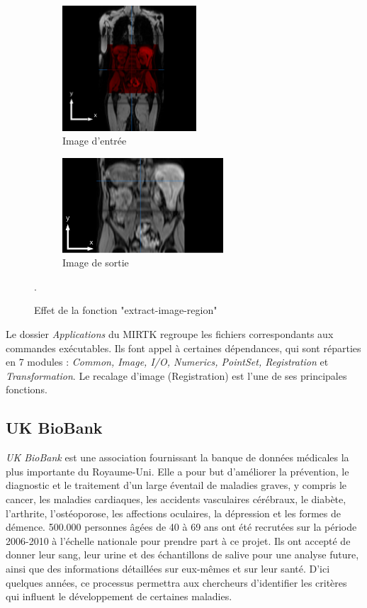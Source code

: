 \documentclass[10pt]{report}
\begin{document}
	\begin{figure}[h!]
		\centering
		\begin{subfigure}{.5\textwidth}
			\centering
			\includegraphics[width=5cm]{Reports/figures/mirtkextractregion1dbis.png}
			\caption{Image d'entrée}
			\label{Image d'entrée}
		\end{subfigure}%
		\begin{subfigure}{.5\textwidth}
			\centering
			\includegraphics[width=6cm]{Reports/figures/mirtkextractregion21d.png}
			\caption{Image de sortie}
			\label{Image de sortie}
		\end{subfigure}
		\caption{Effet de la fonction "extract-image-region"}.
		\label{Effet de la fonction "extract-image-region"}
	\end{figure}	
	\vspace{-0.5cm}
	Le dossier \textit{Applications} du MIRTK regroupe les fichiers correspondants aux commandes exécutables. Ils font appel à certaines dépendances, qui sont réparties en 7 modules : \textit{Common, Image, I/O, Numerics, PointSet, Registration} et \textit{Transformation}. 
	 Le recalage d'image (Registration) est l'une de ses principales fonctions.
	
	 \subsection{UK BioBank}

	 \textit{UK BioBank} est une association fournissant la banque de données médicales la plus importante du Royaume-Uni. Elle a pour but d'améliorer la prévention, le diagnostic et le traitement d'un large éventail de maladies graves, y compris le cancer, les maladies cardiaques, les accidents vasculaires cérébraux, le diabète, l'arthrite, l'ostéoporose, les affections oculaires, la dépression et les formes de démence. 500.000 personnes âgées de 40 à 69 ans ont été recrutées sur la période 2006-2010 à l'échelle nationale pour prendre part à ce projet. Ils ont accepté de donner leur sang, leur urine et des échantillons de salive pour une analyse future, ainsi que des informations détaillées sur eux-mêmes et sur leur santé. D'ici quelques années, ce processus permettra aux chercheurs d'identifier les critères qui influent le développement de certaines maladies.
	 
\end{document}
